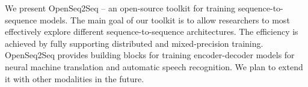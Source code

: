 We present OpenSeq2Seq -- an open-source toolkit for training sequence-to-sequence models. The main goal of our toolkit is to allow researchers to most effectively explore different sequence-to-sequence architectures. The efficiency is achieved by fully supporting distributed and mixed-precision training. OpenSeq2Seq provides building blocks for training encoder-decoder models for neural machine translation and automatic speech recognition. We plan to extend it with other modalities in the future.
